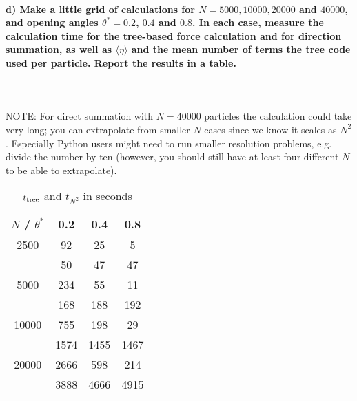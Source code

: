 \paragraph{d) Make a little grid of calculations for 
    $N=5000, 10000, 20000$ and $40000$, and opening angles 
    $\theta^*=0.2$, $0.4$ and $0.8$. In each case, measure the 
    calculation time for the tree-based force calculation and 
    for direction summation, as well as $\langle\eta\rangle$ 
    and the mean number of terms the tree code used per particle. 
    Report the results in a table.
} \ \\
    \\
    NOTE: For direct summation with $N=40000$ particles the 
    calculation could take very long; you can extrapolate from 
    smaller $N$ cases since we know it scales as $N^2$.
    Especially Python users might need to run smaller resolution 
    problems, e.g. divide the number by ten (however, you should 
    still have at least four different $N$ to be able to 
    extrapolate). \\
    \begin{table}[h!]
        \begin{center}
        \caption{$t_\textnormal{tree}$ and $t_{N^2}$ in seconds}
        \begin{tabular}{c | c | c | c}
            $N$ / $\theta^*$ & 0.2  & 0.4  & 0.8 \\
            \hline
            2500             & 92   & 25   & 5    \\
                             & 50   & 47   & 47   \\
            \hline
            5000             & 234  & 55   & 11   \\
                             & 168  & 188  & 192  \\
            \hline
            10000            & 755  & 198  & 29   \\
                             & 1574 & 1455 & 1467 \\
            \hline
            20000            & 2666 & 598  & 214  \\
                             & 3888 & 4666 & 4915 \\
        \end{tabular}
        \end{center}
    \end{table} \ \\ 
